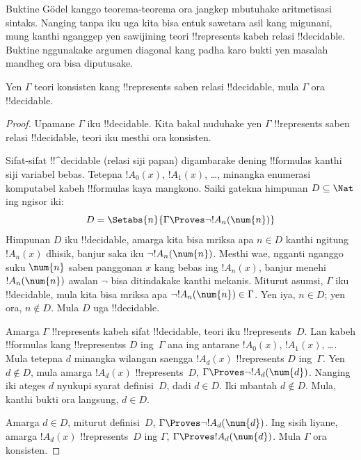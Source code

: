 \documentclass[../../../include/open-logic-section]{subfiles}
\begin{document}


Buktine G\"odel kanggo teorema-teorema ora
jangkep mbutuhake aritmetisasi sintaks. Nanging
tanpa iku uga kita bisa entuk sawetara asil
kang migunani, mung kanthi nganggep yen sawijining
teori !!{represents} kabeh relasi !!{decidable}.
Buktine nggunakake argumen diagonal kang padha
karo bukti yen masalah mandheg ora bisa diputusake.

\begin{thm}
Yen $\Gamma$ teori konsisten kang !!{represents}
saben relasi !!{decidable}, mula $\Gamma$
ora !!{decidable}.
\end{thm}

\begin{proof}
Upamane $\Gamma$ iku !!{decidable}.
Kita bakal nuduhake yen $\Gamma$
!!{represents} saben relasi !!{decidable},
teori iku mesthi ora konsisten.

Sifat-sifat !!^{decidable} (relasi siji papan)
digambarake dening !!{formula}s kanthi siji
variabel bebas. Tetepna $!A_0(x)$, $!A_1(x)$,
\dots, minangka enumerasi komputabel kabeh
!!{formula}s kaya mangkono. Saiki gatekna
himpunan $D \subseteq \Nat$ ing ngisor iki:
\[
D = \Setabs{n}{\Gamma \Proves \lnot !A_n(\num{n})}
\]
Himpunan $D$ iku !!{decidable}, amarga kita
bisa mriksa apa $n \in D$ kanthi ngitung
$!A_n(x)$ dhisik, banjur saka iku
$\lnot !A_n(\num{n})$. Mesthi wae,
ngganti nganggo suku $\num{n}$ saben
panggonan $x$ kang bebas ing $!A_n(x)$,
banjur menehi $!A_n(\num{n})$ awalan $\lnot$
bisa ditindakake kanthi mekanis. Miturut
asumsi, $\Gamma$ iku !!{decidable}, mula
kita bisa mriksa apa
$\lnot !A_n(\num{n}) \in \Gamma$.
Yen iya, $n \in D$; yen ora,
$n \notin D$. Mula $D$ uga !!{decidable}.

Amarga $\Gamma$ !!{represents} kabeh sifat
!!{decidable}, teori iku !!{represents}~$D$.
Lan kabeh !!{formula}s kang !!{represents}s $D$
ing~$\Gamma$ ana ing antarane $!A_0(x)$,
$!A_1(x)$, \dots. Mula tetepna $d$ minangka
wilangan saengga $!A_d(x)$ !!{represents} $D$
ing~$\Gamma$. Yen $d \notin D$, mula amarga
$!A_d(x)$ !!{represents}~$D$,
$\Gamma \Proves \lnot !A_d(\num{d})$.
Nanging iki ateges $d$ nyukupi syarat
definisi~$D$, dadi $d \in D$. Iki
mbantah $d \notin D$. Mula, kanthi
bukti ora langsung, $d \in D$.

Amarga $d \in D$, miturut definisi~$D$,
$\Gamma \Proves \lnot !A_d(\num{d})$.
Ing sisih liyane, amarga $!A_d(x)$
!!{represents}~$D$ ing $\Gamma$,
$\Gamma \Proves !A_d(\num{d})$.
Mula $\Gamma$ ora konsisten.
\end{proof}
\end{document}
